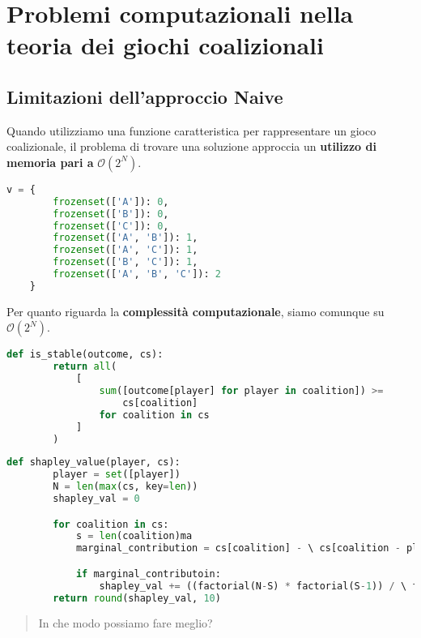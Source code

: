 \section{Problemi computazionali nella teoria dei giochi coalizionali}
\subsection{Limitazioni dell'approccio Naive}

Quando utilizziamo una funzione caratteristica per rappresentare un gioco
coalizionale, il problema di trovare una soluzione approccia un
\textbf{utilizzo di memoria pari a} $\mathcal{O}(2^N)$.

\begin{lstlisting}[language=python]
    v = {
        frozenset(['A']): 0,
        frozenset(['B']): 0,
        frozenset(['C']): 0,
        frozenset(['A', 'B']): 1,
        frozenset(['A', 'C']): 1,
        frozenset(['B', 'C']): 1,
        frozenset(['A', 'B', 'C']): 2
    }
\end{lstlisting}

Per quanto riguarda la \textbf{complessità computazionale}, siamo comunque su
$\mathcal{O}(2^N)$.

\begin{lstlisting}[language=python, caption={Controllo che un outcome sia stabile}]
    def is_stable(outcome, cs):
        return all(
            [
                sum([outcome[player] for player in coalition]) >=
                    cs[coalition]
                for coalition in cs
            ]
        )
\end{lstlisting}

\begin{lstlisting}[language=python, caption={Shapley value}]
    def shapley_value(player, cs):
        player = set([player])
        N = len(max(cs, key=len))
        shapley_val = 0

        for coalition in cs:
            s = len(coalition)ma
            marginal_contribution = cs[coalition] - \ cs[coalition - player]

            if marginal_contributoin:
                shapley_val += ((factorial(N-S) * factorial(S-1)) / \ factorial(N)) * marginal_contribution
        return round(shapley_val, 10)
\end{lstlisting}

\begin{quote}
    In che modo possiamo fare meglio?
\end{quote}

